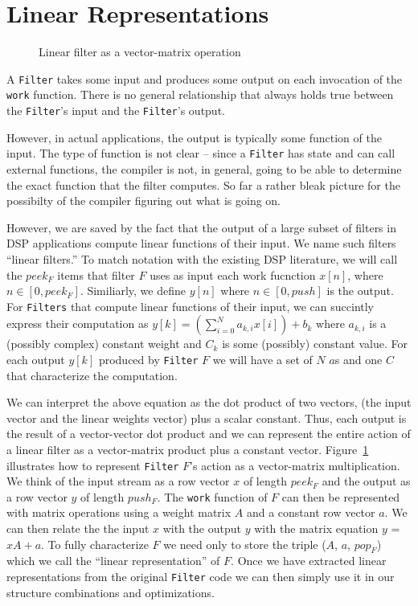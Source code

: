 \section{Linear Representations}
\begin{figure}
\center
\epsfxsize=3.0in
\caption{Linear filter as a vector-matrix operation}
\label{fig:overview-matrix}
\end{figure}

A {\tt Filter} takes some input and produces some output on
each invocation of the {\tt work} function. There is no general 
relationship that always holds true between the {\tt Filter}'s input and
the {\tt Filter}'s output.

However, in actual applications, the output is typically some function of the input. 
The type of function is not clear -- since a {\tt Filter} has state and can call
external functions, the compiler is not, in general, going to be able to determine 
the exact function that the filter computes. So far a rather bleak picture for 
the possibilty of the compiler figuring out what is going on.

However, we are saved by the fact that the output of a large subset of filters 
in DSP applications compute linear functions of their input. We name
such filters ``linear filters.'' To match notation with the existing DSP 
literature, we will call the $peek_F$ items that filter $F$ uses as input
each work fucnction $x[n]$, where  $n\in[0,peek_F]$. Similiarly, we  
define  $y[n]$ where  $n\in[0,push]$ is the output. For {\tt Filters} that
compute linear functions of their input, we can succintly express their
computation as $y[k] = (\sum_{i=0}^{N} a_{k,i}x[i])+b_{k}$ 
where $a_{k,i}$ is a (possibly complex) constant weight and $C_{k}$ is some
(possibly) constant value. For each output $y[k]$ produced by {\tt Filter}
$F$ we will have a set of $N$ $a$s and one $C$ that characterize the computation.

We can interpret the above equation as the dot product of two vectors, (the input 
vector and the linear weights vector) plus a scalar constant. Thus, each output is the result
of a vector-vector dot product and we can represent the entire action of a linear filter 
as a vector-matrix product plus a constant vector. Figure~\ref{fig:overview-matrix} 
illustrates how to represent {\tt Filter} $F$'s action as a vector-matrix 
multiplication. We think of the input stream as a row vector $x$ of length $peek_F$
and the output as a row vector $y$ of length $push_F$. The {\tt work} function
of $F$ can then be represented with matrix operations using a weight matrix $A$ and 
a constant row vector $a$. We can then relate the the input $x$ with the output $y$
with the matrix equation $y$ = $xA + a$. To fully characterize $F$ we need only to 
store the triple ($A$, $a$, $pop_F$) which we call the ``linear representation'' of $F$. 
Once we have extracted linear representations from the original {\tt Filter} code we can
then simply use it in our structure combinations and optimizations.

